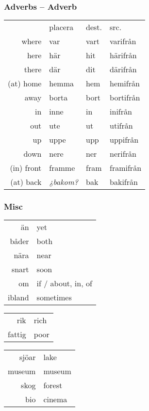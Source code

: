\documentclass[14pt]{refcard} %
\begin{document}
\subsubsection{Adverbs -- Adverb}

\begin{tabular}{rlll}
            & placera & dest. & src. \\[1ex]
where       & var     & vart  & varifrån  \\[.5ex]
here        & här     & hit   & härifrån  \\
there       & där     & dit   & därifrån  \\[.5ex]
(at) home   & hemma   & hem   & hemifrån  \\
away        & borta   & bort  & bortifrån \\[.5ex]
in          & inne    & in    & inifrån   \\
out         & ute     & ut    & utifrån   \\[.5ex]
up          & uppe    & upp   & uppifrån  \\
down        & nere    & ner   & nerifrån  \\[.5ex]
(in) front  & framme  & fram  & framifrån \\
(at) back   & \emph{¿bakom?} & bak   & bakifrån \\
\end{tabular}


\subsubsection{Misc}

\begin{tabular}{rl}
än    & yet  \\
båder & both \\
nära  & near \\
snart & soon \\
om    & if / about, in, of \\
ibland & sometimes \\
\end{tabular}

\begin{tabular}{rl}
rik & rich \\
fattig & poor \\
\end{tabular}

\begin{tabular}{rl}
sjöar & lake \\
museum & museum \\
skog & forest \\
bio & cinema \\
\end{tabular}
\end{document}
